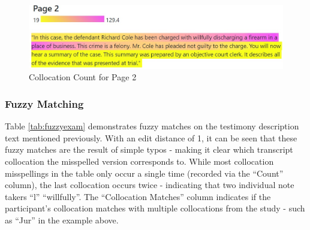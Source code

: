 \documentclass[print]{nuthesis}
\begin{document}
\begin{figure}

{\centering \includegraphics[width=\linewidth]{images/collocationanalysis} 

}

\caption{Collocation Count for Page 2}\label{fig:highlights}
\end{figure}

\hypertarget{fuzzy-matching-1}{%
\subsubsection{Fuzzy Matching}\label{fuzzy-matching-1}}

Table \ref{tab:fuzzyexam} demonstrates fuzzy matches on the testimony description text mentioned previously.
With an edit distance of 1, it can be seen that these fuzzy matches are the result of simple typos - making it clear which transcript collocation the misspelled version corresponds to.
While most collocation misspellings in the table only occur a single time (recorded via the ``Count'' column), the last collocation occurs twice - indicating that two individual note takers  ``l''  ``willfully''.
The ``Collocation Matches'' column indicates if the participant's collocation matches with multiple collocations from the study - such as ``Jur'' in the example above.
\end{document}
